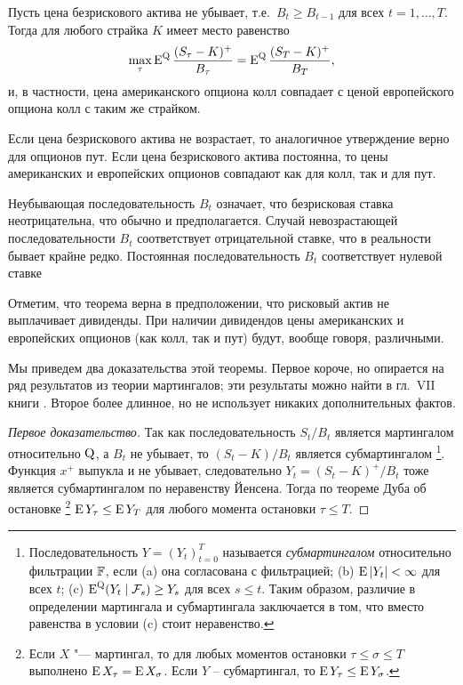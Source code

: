 \begin{theorem}
Пусть цена безрискового актива не убывает, т.е.\ $B_t\ge B_{t-1}$ для всех $t=1,\dots,T$.
Тогда для любого страйка $K$ имеет место равенство
\[
\max_{\tau} \operatorname{E}^{\mathrm{Q}} \frac{(S_\tau - K)^+}{B_\tau} = \operatorname{E}^{\mathrm{Q}} \frac{(S_T - K)^+}{B_T},
\]
и, в частности, цена американского опциона колл совпадает с ценой европейского опциона колл с таким же страйком.

Если цена безрискового актива не возрастает, то аналогичное утверждение верно для опционов пут.
Если цена безрискового актива постоянна, то цены американских и европейских опционов совпадают как для колл, так и для пут.
\end{theorem}

\begin{remark}
Неубывающая последовательность $B_t$ означает, что безрисковая ставка неотрицательна, что обычно и предполагается.
Случай невозрастающей последовательности $B_t$ соответствует отрицательной ставке, что в реальности бывает крайне редко.
Постоянная последовательность $B_t$ соответствует нулевой ставке%
\end{remark}

\begin{remark}
Отметим, что теорема верна в предположении, что рисковый актив не выплачивает дивиденды.
При наличии дивидендов цены американских и европейских опционов (как колл, так и пут) будут, вообще говоря, различными.
\end{remark}

Мы приведем два доказательства этой теоремы.
Первое короче, но опирается на ряд результатов из теории мартингалов;
эти результаты можно найти в гл.~VII книги \cite{Shiryaev04}.
Второе более длинное, но не использует никаких дополнительных фактов.

\begin{proof}[Первое доказательство]
Так как последовательность $S_t/B_t$ является мартингалом относительно $\mathrm{Q}$, а $B_t$ не убывает, то $(S_t-K)/B_t$ является субмартингалом%
\footnote{Последовательность $Y=(Y_t)_{t=0}^T$ называется \emph{субмартингалом} относительно фильтрации $\mathbb{F}$, если (a) она согласована с фильтрацией; (b) $\operatorname{E}|Y_t| <\infty$ для всех $t$; (c) $\operatorname{E}^{\mathrm{Q}}(Y_t\mid\mathcal{F}_s) \ge Y_s$ для всех $s\le t$.
Таким образом, различие в определении мартингала и субмартингала заключается в том, что вместо равенства в условии (c) стоит неравенство.}.
Функция $x^+$ выпукла и не убывает, следовательно $Y_t = (S_t-K)^+/B_t$ тоже является субмартингалом по неравенству Йенсена.
Тогда по теореме Дуба об остановке%
\footnote{Если $X$ "--- мартингал, то для любых моментов остановки $\tau\le\sigma\le T$ выполнено $\operatorname{E} X_\tau = \operatorname{E} X_\sigma$. Если $Y$ -- субмартингал, то $\operatorname{E} Y_\tau \le \operatorname{E} Y_\sigma$.}
$\operatorname{E} Y_\tau \le \operatorname{E} Y_T$ для любого момента остановки $\tau\le T$.
\end{proof}

